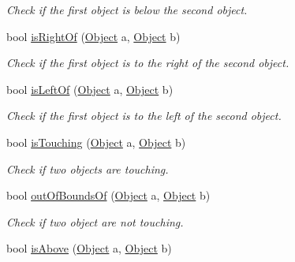 \begin{DoxyCompactItemize}
\begin{DoxyCompactList}\small\item\em Check if the first object is below the second object. \end{DoxyCompactList}\item 
bool \hyperlink{classCollision_a9330290516beca87905e81a974ffca83}{is\+Right\+Of} (\hyperlink{classObject}{Object} a, \hyperlink{classObject}{Object} b)\hypertarget{classCollision_a9330290516beca87905e81a974ffca83}{}\label{classCollision_a9330290516beca87905e81a974ffca83}

\begin{DoxyCompactList}\small\item\em Check if the first object is to the right of the second object. \end{DoxyCompactList}\item 
bool \hyperlink{classCollision_aea67f8b0cd9b37408e2f6f65006b27d3}{is\+Left\+Of} (\hyperlink{classObject}{Object} a, \hyperlink{classObject}{Object} b)\hypertarget{classCollision_aea67f8b0cd9b37408e2f6f65006b27d3}{}\label{classCollision_aea67f8b0cd9b37408e2f6f65006b27d3}

\begin{DoxyCompactList}\small\item\em Check if the first object is to the left of the second object. \end{DoxyCompactList}\item 
bool \hyperlink{classCollision_ae005eb1d857f6127b2673aecacbbd03f}{is\+Touching} (\hyperlink{classObject}{Object} a, \hyperlink{classObject}{Object} b)\hypertarget{classCollision_ae005eb1d857f6127b2673aecacbbd03f}{}\label{classCollision_ae005eb1d857f6127b2673aecacbbd03f}

\begin{DoxyCompactList}\small\item\em Check if two objects are touching. \end{DoxyCompactList}\item 
bool \hyperlink{classCollision_a4fae301767751ae007e953d1d2f49e7b}{out\+Of\+Bounds\+Of} (\hyperlink{classObject}{Object} a, \hyperlink{classObject}{Object} b)\hypertarget{classCollision_a4fae301767751ae007e953d1d2f49e7b}{}\label{classCollision_a4fae301767751ae007e953d1d2f49e7b}

\begin{DoxyCompactList}\small\item\em Check if two object are not touching. \end{DoxyCompactList}\item 
bool \hyperlink{classCollision_aecbf1758ca3a93a39568dbdf87213f20}{is\+Above} (\hyperlink{classObject}{Object} a, \hyperlink{classObject}{Object} b)\hypertarget{classCollision_aecbf1758ca3a93a39568dbdf87213f20}{}\label{classCollision_aecbf1758ca3a93a39568dbdf87213f20}


\end{DoxyCompactItemize}
